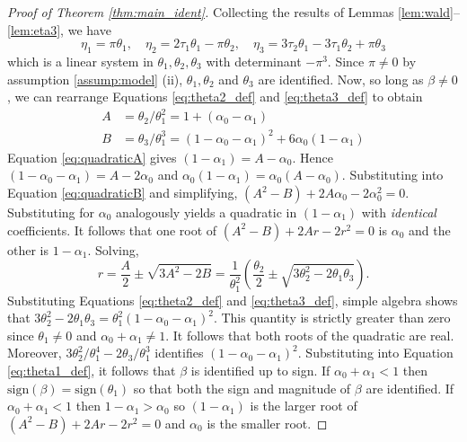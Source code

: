 
\begin{proof}[Proof of Theorem \ref{thm:main_ident}]
  Collecting the results of Lemmas \ref{lem:wald}--\ref{lem:eta3}, we have
\[
 \eta_1 = \pi\theta_1, \quad
  \eta_2 =  2\tau_1 \theta_1 - \pi \theta_2, \quad
  \eta_3 = 3\tau_2 \theta_1 - 3\tau_1 \theta_2 + \pi\theta_3
\]
which is a linear system in $\theta_1, \theta_2, \theta_3$ with determinant $-\pi^3$.
Since $\pi \neq 0$ by assumption \ref{assump:model} (ii), $\theta_1, \theta_2$ and $\theta_3$ are identified.
  Now, so long as $\beta \neq 0$, we can rearrange Equations \ref{eq:theta2_def} and \ref{eq:theta3_def} to obtain 
  \begin{align}
    \label{eq:quadraticA}
  A &= \theta_2/\theta_1^2 = 1 + (\alpha_0 - \alpha_1)  \\
  \label{eq:quadraticB}
  B &= \theta_3/\theta_1^3 = (1 - \alpha_0 - \alpha_1)^2 + 6 \alpha_0 (1 - \alpha_1)
  \end{align}
  Equation \ref{eq:quadraticA} gives $(1 - \alpha_1)= A - \alpha_0$.
  Hence $(1 - \alpha_0 - \alpha_1) = A - 2\alpha_0$ and $\alpha_0(1 - \alpha_1) = \alpha_0(A - \alpha_0)$.
  Substituting into Equation \ref{eq:quadraticB} and simplifying, $(A^2 - B) + 2A \alpha_0 - 2\alpha_0^2=0$.
  Substituting for $\alpha_0$ analogously yields a quadratic in $(1 - \alpha_1)$ with \emph{identical} coefficients.
It follows that one root of $(A^2-B) + 2Ar - 2r^2=0$ is $\alpha_0$ and the other is $1 - \alpha_1$.
Solving,
  \begin{equation}
    r = \frac{A}{2} \pm \sqrt{3 A^2 - 2B} = \frac{1}{\theta_1^2}\left(\frac{\theta_2}{2} \pm  \sqrt{3\theta_2^2  - 2\theta_1 \theta_3}\right).
  \end{equation}
Substituting Equations \ref{eq:theta2_def} and \ref{eq:theta3_def}, simple algebra shows that $3\theta_2^2 - 2 \theta_1\theta_3 = \theta_1^2(1 - \alpha_0 - \alpha_1)^2$.
This quantity is strictly greater than zero since $\theta_1 \neq 0$ and $\alpha_0 + \alpha_1 \neq 1$.
It follows that both roots of the quadratic are real.
Moreover, $3\theta_2^2/\theta_1^4 - 2\theta_3/\theta_1^3$ identifies $(1 - \alpha_0 - \alpha_1)^2$.
Substituting into Equation \ref{eq:theta1_def}, it follows that $\beta$ is identified up to sign.
If $\alpha_0 + \alpha_1 < 1$ then $\mbox{sign}(\beta) = \mbox{sign}(\theta_1)$ so that both the sign and magnitude of $\beta$ are identified.
If $\alpha_0 + \alpha_1 < 1$ then $1 - \alpha_1 > \alpha_0$ so $(1 - \alpha_1)$ is the larger root of $(A^2 - B) + 2Ar - 2r^2=0$ and $\alpha_0$ is the smaller root.
\end{proof}
